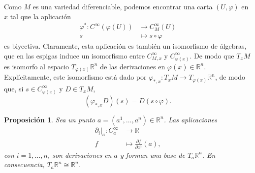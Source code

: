 \documentclass[12pt,a4paper]{book}
\newtheorem{prop}[thm]{Proposición}
\theoremstyle{definition} \newtheorem{defn}[thm]{Definición}
\theoremstyle{definition} \newtheorem{ejemplo}[thm]{Ejemplo}
\theoremstyle{definition} \newtheorem{ejercicio}[thm]{Ejercicio}
\theoremstyle{remark} \newtheorem*{obs}{Observación}
\def\RR{\mathbb{R}}
\begin{document}
	    Como $M$ es una variedad diferenciable, podemos encontrar una carta $(U,\varphi)$ en $x$ tal que la aplicación 
	    \begin{align*}
	      \varphi^* :C^\infty(\varphi(U))&\longrightarrow C^\infty_M(U) \\ 
	      s &\longmapsto s \circ \varphi 
	      \end{align*}
	      es biyectiva. Claramente, esta aplicación es también un isomorfismo de álgebras, que en las espigas induce un isomorfismo entre $C^\infty_{M,x}$ y $C^{\infty}_{\varphi(x)}$. De modo que $T_xM$ es isomorfo al espacio $T_{\varphi(x)}\RR^n$ de las derivaciones en $\varphi(x)\in \RR^n$. Explícitamente, este isomorfismo está dado por $\varphi_{*,x}:T_xM \rightarrow T_{\varphi(x)}\RR^n$, de modo que, si $s\in C^\infty_{\varphi(x)}$ y $D\in T_xM$,
	      \begin{equation*}
		(\varphi_{*,x} D) (s) = D(s\circ \varphi).
	      \end{equation*}

	      \begin{prop}
		Sea un punto $a=(a^1,\dots,a^n)\in \RR^n$. Las aplicaciones
		\begin{align*}
		   \partial_i|_a:C^\infty_a&\longrightarrow \RR\\ 
		   f &\longmapsto \frac{\partial f}{\partial x^i}(a),
		  \end{align*}
		  con $i=1,\dots,n$, son derivaciones en $a$ y forman una base de $T_a \RR^n$. En consecuencia, $T_a \RR^n \cong \RR^n$.
	      \end{prop}
\end{document}
